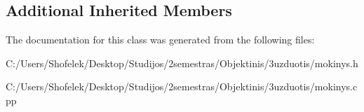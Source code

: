 \subsection*{Additional Inherited Members}


The documentation for this class was generated from the following files\+:\begin{DoxyCompactItemize}
\item 
C\+:/\+Users/\+Shofelek/\+Desktop/\+Studijos/2semestras/\+Objektinis/3uzduotis/mokinys.\+h\item 
C\+:/\+Users/\+Shofelek/\+Desktop/\+Studijos/2semestras/\+Objektinis/3uzduotis/mokinys.\+cpp\end{DoxyCompactItemize}
